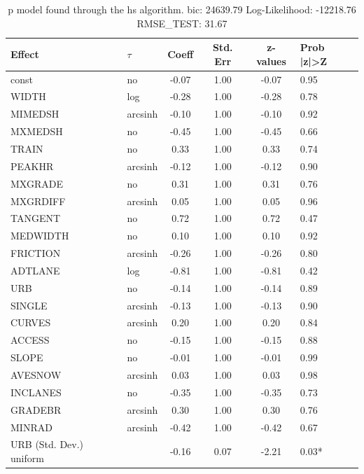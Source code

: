 \begin{table}
	\caption{p model found through the hs algorithm. bic: 24639.79 Log-Likelihood: -12218.76 RMSE_TEST: 31.67}
	\begin{center}
		\begin{tabular}{|l|l|c|c|c|l|}
			\hline
			Effect & $\tau$ & Coeff & Std. Err & z-values & Prob |z|>Z \\
			\hline
			const & no & -0.07 & 1.00 & -0.07 & 0.95 \\
			\hline
			WIDTH & log & -0.28 & 1.00 & -0.28 & 0.78 \\
			\hline
			MIMEDSH & arcsinh & -0.10 & 1.00 & -0.10 & 0.92 \\
			\hline
			MXMEDSH & no & -0.45 & 1.00 & -0.45 & 0.66 \\
			\hline
			TRAIN & no & 0.33 & 1.00 & 0.33 & 0.74 \\
			\hline
			PEAKHR & arcsinh & -0.12 & 1.00 & -0.12 & 0.90 \\
			\hline
			MXGRADE & no & 0.31 & 1.00 & 0.31 & 0.76 \\
			\hline
			MXGRDIFF & arcsinh & 0.05 & 1.00 & 0.05 & 0.96 \\
			\hline
			TANGENT & no & 0.72 & 1.00 & 0.72 & 0.47 \\
			\hline
			MEDWIDTH & no & 0.10 & 1.00 & 0.10 & 0.92 \\
			\hline
			FRICTION & arcsinh & -0.26 & 1.00 & -0.26 & 0.80 \\
			\hline
			ADTLANE & log & -0.81 & 1.00 & -0.81 & 0.42 \\
			\hline
			URB & no & -0.14 & 1.00 & -0.14 & 0.89 \\
			\hline
			SINGLE & arcsinh & -0.13 & 1.00 & -0.13 & 0.90 \\
			\hline
			CURVES & arcsinh & 0.20 & 1.00 & 0.20 & 0.84 \\
			\hline
			ACCESS & no & -0.15 & 1.00 & -0.15 & 0.88 \\
			\hline
			SLOPE & no & -0.01 & 1.00 & -0.01 & 0.99 \\
			\hline
			AVESNOW & arcsinh & 0.03 & 1.00 & 0.03 & 0.98 \\
			\hline
			INCLANES & no & -0.35 & 1.00 & -0.35 & 0.73 \\
			\hline
			GRADEBR & arcsinh & 0.30 & 1.00 & 0.30 & 0.76 \\
			\hline
			MINRAD & arcsinh & -0.42 & 1.00 & -0.42 & 0.67 \\
			\hline
			URB (Std. Dev.) uniform &  & -0.16 & 0.07 & -2.21 & 0.03* \\

\end{tabular}
\end{center}
\end{table}
